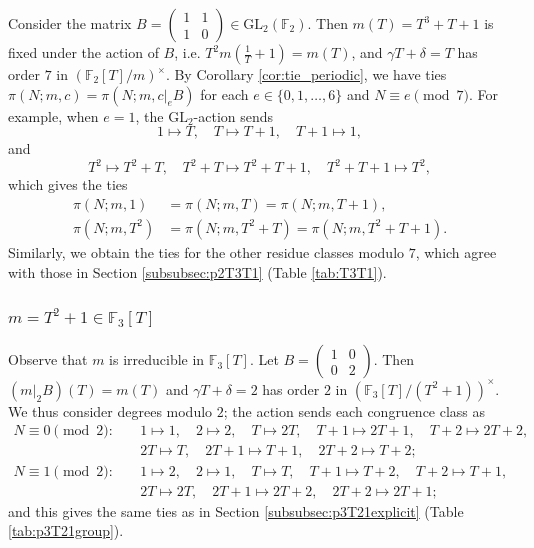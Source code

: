 \documentclass[10pt,reqno]{amsproc}
\newcommand{\GL}{\mathrm{GL}}
\newcommand{\bF}{\mathbb{F}}
\newcommand{\1}{\mathds{1}}	%
\theoremstyle{definition}
\theoremstyle{remark}
\begin{document}
Consider the matrix $B = \left(\begin{smallmatrix} 1 & 1 \\ 1 & 0 \end{smallmatrix} \right) \in \GL_2(\bF_2)$.
Then $m(T) = T^3 + T + 1$ is fixed under the action of $B$, i.e. $T^2 m\left(\frac{1}{T}+1\right) = m(T)$, and $\gamma T + \delta = T$ has order $7$ in $(\bF_2[T]/m)^{\times}$.
By Corollary \ref{cor:tie_periodic}, we have ties $\pi(N; m, c) = \pi(N; m, c|_e B)$ for each $e \in \{0, 1, \dots, 6\}$ and $N \equiv e \pmod{7}$.
For example, when $e = 1$, the $\GL_2$-action sends 
\[
1 \mapsto T,\quad 
T \mapsto T + 1,\quad 
T + 1 \mapsto 1,
\]
and
\[
T^2 \mapsto T^2 + T,\quad 
T^2 + T \mapsto T^2 + T + 1,\quad 
T^2 + T + 1 \mapsto T^2,
\]
which gives the ties
\begin{align*}
    \pi(N; m, 1) &= \pi(N; m, T) = \pi(N; m, T+1),\\
    \pi(N; m, T^2) &= \pi(N; m, T^2+T) = \pi(N; m, T^2+T+1).
\end{align*}
Similarly, we obtain the ties for the other residue classes modulo $7$, which agree with those in Section \ref{subsubsec:p2T3T1} (Table \ref{tab:T3T1}).



\subsubsection{\texorpdfstring{\(m = T^2 + 1 \in \bF_3[T]\)}{m = T^2 + 1 over characteristic 3}}
\label{subsubsec:p3T21}

Observe that $m$ is irreducible in $\mathbb{F}_3[T]$. Let $B = \left(\begin{smallmatrix} 1 & 0 \\ 0 & 2 \end{smallmatrix} \right)$. Then $(m|_2 B)(T) = m(T)$ and $\gamma T + \delta = 2$ has order $2$ in $\left(\mathbb{F}_3[T]/(T^2 + 1)\right)^\times$. We thus consider degrees modulo $2$; the action sends each congruence class as
\begin{align*}
    N \equiv 0 \pmod{2} : \quad & 1 \mapsto 1, \quad 2 \mapsto 2, \quad T \mapsto 2T, \quad T + 1 \mapsto 2T + 1, \quad T + 2 \mapsto 2T + 2, \\ 
    & 2T \mapsto T, \quad 2T + 1 \mapsto T + 1, \quad 2T + 2 \mapsto T + 2; \\
    N \equiv 1 \pmod{2} : \quad & 1 \mapsto 2, \quad 2 \mapsto 1, \quad T \mapsto T, \quad T + 1 \mapsto T + 2, \quad T + 2 \mapsto T + 1, \\ 
    & 2T \mapsto 2T, \quad 2T + 1 \mapsto 2T + 2, \quad 2T + 2 \mapsto 2T + 1;
\end{align*}
and this gives the same ties as in Section \ref{subsubsec:p3T21explicit} (Table \ref{tab:p3T21group}).
\end{document}
